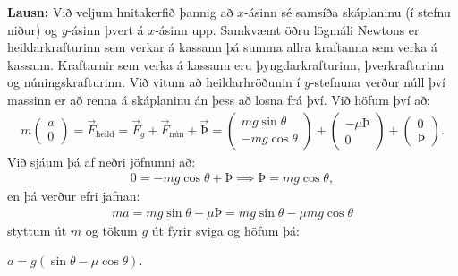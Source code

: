 \textbf{Lausn:} Við veljum hnitakerfið þannig að $x$-ásinn sé samsíða skáplaninu (í stefnu niður) og $y$-ásinn þvert á $x$-ásinn upp. Samkvæmt öðru lögmáli Newtons er heildarkrafturinn sem verkar á kassann þá summa allra kraftanna sem verka á kassann. Kraftarnir sem verka á kassann eru þyngdarkrafturinn, þverkrafturinn og núningskrafturinn. Við vitum að heildarhröðunin í $y$-stefnuna verður núll því massinn er að renna á skáplaninu án þess að losna frá því. Við höfum því að:
\begin{align*}
    m \begin{pmatrix}
    a \\
    0
    \end{pmatrix} = \vec{F}_{\text{heild}} =  \vec{F}_g + \vec{F}_{\text{nún}} + \vec{Þ} = \begin{pmatrix}
    mg\sin\theta \\
    -mg\cos\theta
    \end{pmatrix} + \begin{pmatrix}
    -\mu Þ \\
    0
    \end{pmatrix} + \begin{pmatrix}
    0 \\
    Þ
    \end{pmatrix}.
\end{align*}
Við sjáum þá af neðri jöfnunni að:
\begin{align*}
    0 = -mg\cos\theta + Þ \implies Þ = mg\cos\theta,
\end{align*}
en þá verður efri jafnan:
\begin{align*}
    ma = mg\sin\theta - \mu Þ = mg\sin\theta - \mu mg\cos\theta
\end{align*}
styttum út $m$ og tökum $g$ út fyrir sviga og höfum þá:
\begin{center}
\begin{tcbox}[nobeforeafter]{$a = g\left( \sin\theta - \mu \cos\theta \right).$}
\end{tcbox}
\end{center}

